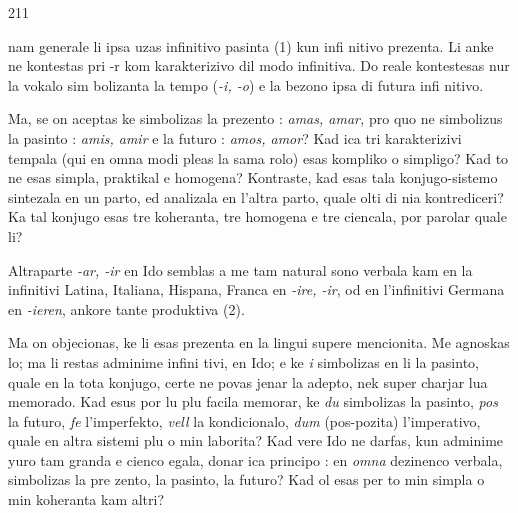\begin{VUpage}[215]{211}

\VUcontinue
nam generale li ipsa uzas infinitivo pasinta (1) kun infi\cc
nitivo prezenta. Li anke ne kontestas pri -r kom karakterizivo\nl
dil modo infinitiva. Do reale kontestesas nur la vokalo sim\cc
bolizanta la tempo (\textit{-i, -o}) e la bezono ipsa di futura infi\cc
nitivo.

Ma, se on aceptas ke  simbolizas la prezento : \textit{amas, amar,}\nl
pro quo  ne simbolizus la pasinto : \textit{amis, amir} e  la futuro :\nl
\textit{amos, amor}? Kad ica tri karakterizivi tempala (qui en omna\nl
modi pleas la sama rolo) esas kompliko o simpligo? Kad to\nl
ne esas simpla, praktikal e homogena? Kontraste, kad esas\nl
tala konjugo-sistemo sintezala en un parto, ed analizala en\nl
l'altra parto, quale olti di nia kontrediceri? Ka tal konjugo\nl
esas tre koheranta, tre homogena e tre ciencala, por parolar\nl
quale li?

Altraparte \textit{-ar, -ir} en Ido semblas a me tam natural sono\nl
verbala kam en la infinitivi Latina, Italiana, Hispana,\nl
Franca en \textit{-ire, -ir}, od en l'infinitivi Germana en \textit{-ieren},\nl
ankore tante produktiva (2).

Ma on objecionas, ke li esas prezenta en la lingui supere\nl
mencionita. Me agnoskas lo; ma li restas adminime infini\cc
tivi, en Ido; e ke \textit{i} simbolizas en li la pasinto, quale en la\nl
tota konjugo, certe ne povas jenar la adepto, nek super\cc
charjar lua memorado. Kad esus por lu plu facila memorar,\nl
ke \textit{du} simbolizas la pasinto, \textit{pos} la futuro, \textit{fe} l'imperfekto,\nl
\textit{vell} la kondicionalo, \textit{dum} (pos-pozita) l'imperativo, quale\nl
en altra sistemi plu o min laborita? Kad vere Ido ne darfas,\nl
kun adminime yuro tam granda e cienco egala, donar ica\nl
principo : en \textit{omna} dezinenco verbala,  simbolizas la pre\cc
zento,  la pasinto,  la futuro? Kad ol esas per to min\nl
simpla o min koheranta kam altri?


\end{VUpage}
